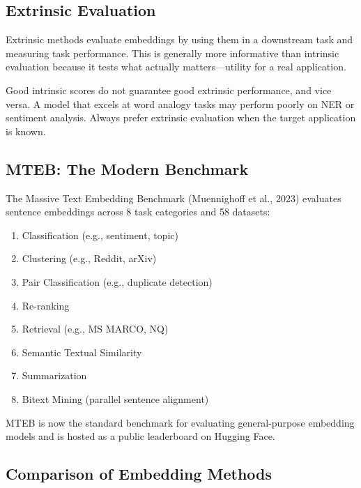 \subsection{Extrinsic Evaluation}

Extrinsic methods evaluate embeddings by using them in a downstream task and
measuring task performance.  This is generally more informative than intrinsic
evaluation because it tests what actually matters---utility for a real
application.

\begin{warningbox}
Good intrinsic scores do not guarantee good extrinsic performance, and vice
versa.  A model that excels at word analogy tasks may perform poorly on NER
or sentiment analysis.  Always prefer extrinsic evaluation when the target
application is known.
\end{warningbox}

\subsection{MTEB: The Modern Benchmark}

The Massive Text Embedding Benchmark (Muennighoff et al., 2023) evaluates
sentence embeddings across 8 task categories and 58 datasets:
\begin{enumerate}
    \item Classification (e.g., sentiment, topic)
    \item Clustering (e.g., Reddit, arXiv)
    \item Pair Classification (e.g., duplicate detection)
    \item Re-ranking
    \item Retrieval (e.g., MS MARCO, NQ)
    \item Semantic Textual Similarity
    \item Summarization
    \item Bitext Mining (parallel sentence alignment)
\end{enumerate}

MTEB is now the standard benchmark for evaluating general-purpose embedding
models and is hosted as a public leaderboard on Hugging Face.

\subsection{Comparison of Embedding Methods}

